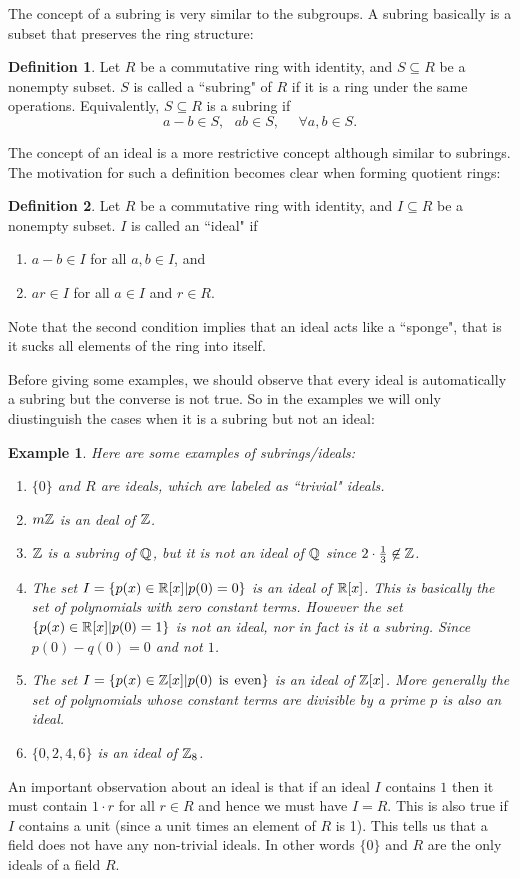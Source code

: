 \documentclass[12pt]{article}
\theoremstyle{plain}
\newtheorem{example}{Example}
\theoremstyle{definition}
\newtheorem{definition}{Definition}
\theoremstyle{remark}
\begin{document}
The concept of a subring is very similar to the subgroups. A subring basically is a subset that preserves the ring structure:
\begin{definition}
Let $R$ be a commutative ring with identity, and $S\subseteq R$ be a nonempty subset. $S$ is called a ``subring" of $R$ if it is a ring under the same operations. Equivalently, $S\subseteq R$ is a subring if 
$$a-b\in S, \:\:\: ab\in S, \:\:\:\:\:\:\forall a,b\in S.$$
\end{definition}
The concept of an ideal is a more restrictive concept although similar to subrings. The motivation for such a definition becomes clear when forming quotient rings:
\begin{definition}
Let $R$ be a commutative ring with identity, and $I\subseteq R$ be a nonempty subset. $I$ is called an ``ideal" if
\begin{enumerate}
    \item $a-b\in I$ for all $a,b \in I$, and
    \item $ar \in I$ for all $a \in I$ and $r \in R$.
\end{enumerate}
\end{definition}
Note that the second condition implies that an ideal acts like a ``sponge", that is it sucks all elements of the ring into itself. 

Before giving some examples, we should observe that every ideal is automatically a subring but the converse is not true. So in the examples we will only diustinguish the cases when it is a subring but not an ideal:
\begin{example}
Here are some examples of subrings/ideals:
\begin{enumerate}
    \item $\{0\}$ and $R$ are ideals, which are labeled as ``trivial" ideals. 
    \item $m\mathbb{Z}$ is an deal of $\mathbb{Z}$.
    \item $\mathbb{Z}$ is a subring of $\mathbb{Q}$, but it is not an ideal of $\mathbb{Q}$ since $2\cdot \frac{1}{3} \not \in \mathbb{Z}$. 
    \item The set $I = \{p(x) \in \mathbb{R}[x]|p(0)=0\}$ is an ideal of $\mathbb{R}[x]$. This is basically the set of polynomials with zero constant terms. However the set $\{p(x)\in \mathbb{R}[x]|p(0)=1\}$ is not an ideal, nor in fact is it a subring. Since $p(0)-q(0)=0$ and not $1$.
    \item The set $I = \{p(x) \in \mathbb{Z}[x] | p(0) \:\:\textrm{is} \:\:\textrm{even}\}$ is an ideal of $\mathbb{Z}[x]$. More generally the set of polynomials whose constant terms are divisible by a prime $p$ is also an ideal. 
    \item $\{0,2,4,6\}$ is an ideal of $\mathbb{Z}_8$. 
\end{enumerate}
\end{example}
An important observation about an ideal is that if an ideal $I$ contains $1$ then it must contain $1\cdot r$ for all $r\in R$ and hence we must have $I=R$. This is also true if $I$ contains a unit (since a unit times an element of $R$ is 1). This tells us that a field does not have any non-trivial ideals. In other words $\{0\}$ and $R$ are the only ideals of a field $R$. 
\end{document}
